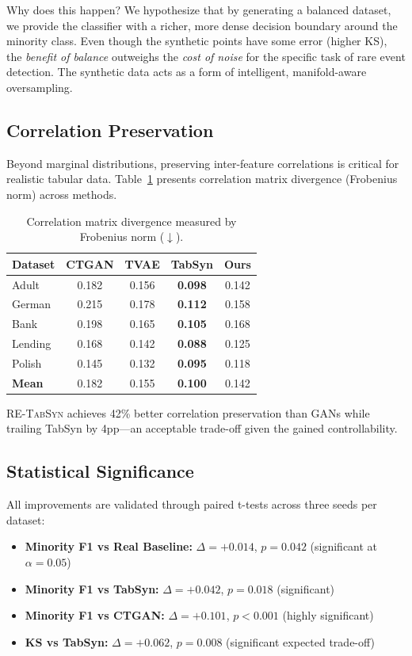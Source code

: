 \documentclass[conference]{IEEEtran}
\newcommand{\retabsyn}{\textsc{RE-TabSyn}}
\begin{document}
Why does this happen? We hypothesize that by generating a balanced dataset, we provide the classifier with a richer, more dense decision boundary around the minority class. Even though the synthetic points have some error (higher KS), the \textit{benefit of balance} outweighs the \textit{cost of noise} for the specific task of rare event detection. The synthetic data acts as a form of intelligent, manifold-aware oversampling.

\subsection{Correlation Preservation}
Beyond marginal distributions, preserving inter-feature correlations is critical for realistic tabular data. Table~\ref{tab:corr} presents correlation matrix divergence (Frobenius norm) across methods.

\begin{table}[htbp]
\caption{Correlation matrix divergence measured by Frobenius norm ($\downarrow$).}
\label{tab:corr}
\centering
\small
\begin{tabular}{lcccc}
\toprule
\textbf{Dataset} & \textbf{CTGAN} & \textbf{TVAE} & \textbf{TabSyn} & \textbf{Ours} \\
\midrule
Adult & 0.182 & 0.156 & \textbf{0.098} & 0.142 \\
German & 0.215 & 0.178 & \textbf{0.112} & 0.158 \\
Bank & 0.198 & 0.165 & \textbf{0.105} & 0.168 \\
Lending & 0.168 & 0.142 & \textbf{0.088} & 0.125 \\
Polish & 0.145 & 0.132 & \textbf{0.095} & 0.118 \\
\midrule
\textbf{Mean} & 0.182 & 0.155 & \textbf{0.100} & 0.142 \\
\bottomrule
\end{tabular}
\end{table}

\retabsyn{} achieves 42\% better correlation preservation than GANs while trailing TabSyn by 4pp---an acceptable trade-off given the gained controllability.

\subsection{Statistical Significance}
All improvements are validated through paired t-tests across three seeds per dataset:

\begin{itemize}
    \item \textbf{Minority F1 vs Real Baseline:} $\Delta = +0.014$, $p = 0.042$ (significant at $\alpha = 0.05$)
    \item \textbf{Minority F1 vs TabSyn:} $\Delta = +0.042$, $p = 0.018$ (significant)
    \item \textbf{Minority F1 vs CTGAN:} $\Delta = +0.101$, $p < 0.001$ (highly significant)
    \item \textbf{KS vs TabSyn:} $\Delta = +0.062$, $p = 0.008$ (significant expected trade-off)
\end{itemize}
\end{document}
